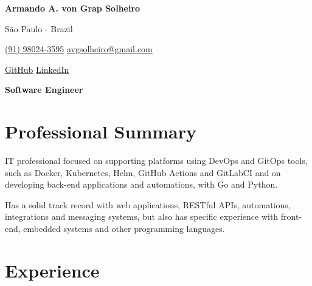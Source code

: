 \documentclass[a4paper,10pt]{article}
\begin{document}

\noindent
\begin{minipage}[t]{0.5\textwidth}
\textbf{\Large Armando A. von Grap Solheiro}

\vspace{0.4em}

\end{minipage}%
\begin{minipage}[t]{0.5\textwidth}
\raggedleft

São Paulo - Brazil

{\color{blue}} \href{tel:+5591980243595}{\faPhone \space (91) 98024-3595}
{\color{blue}} \href{mailto:avgsolheiro@gmail.com}{\faEnvelope \space avgsolheiro@gmail.com}

\vspace{0.2em}
 \quad
{\color{blue}} \href{https://github.com/asolheiro}{\faGithub \space GitHub} \quad
{\color{blue}} \href{https://www.linkedin.com/in/armandosolheiro/}{\faLinkedin \space LinkedIn} \\
\end{minipage}

\vspace{1em}

\begin{center}
    \textbf{\Large Software Engineer}
\end{center}
\vspace{0.5em}

\section*{Professional Summary}

IT professional focused on supporting platforms using DevOps and GitOps tools, such as Docker, Kubernetes, Helm, GitHub Actions and GitLabCI and on developing back-end applications and automations, with Go and Python.

Has a solid track record with web applications, RESTful APIs, automations, integrations and messaging systems, but also has specific experience with front-end, embedded systems and other programming languages.

\vspace{0.6em}
\vspace{0.5em}

\section*{Experience}
\end{document}
